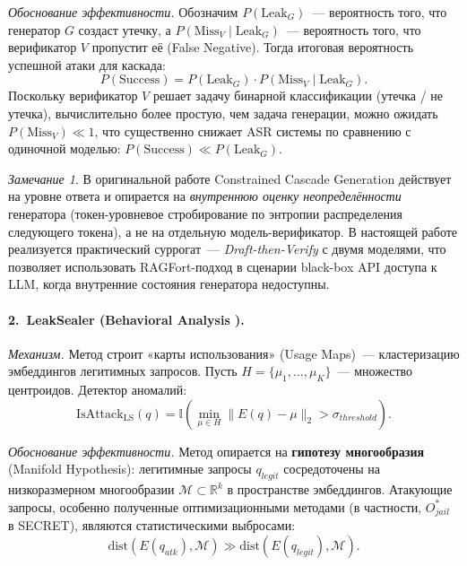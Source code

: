 \documentclass[12pt, a4paper]{article}
\theoremstyle{definition}
\theoremstyle{remark}
\newtheorem*{remark}{Замечание}
\begin{document}
\textit{Обоснование эффективности.} Обозначим $P(\mathrm{Leak}_G)$~--- вероятность того, что генератор $G$ создаст утечку, а $P(\mathrm{Miss}_V \mid \mathrm{Leak}_G)$~--- вероятность того, что верификатор $V$ пропустит её (False Negative). Тогда итоговая вероятность успешной атаки для каскада:
\begin{equation}
    P(\text{Success}) = P(\mathrm{Leak}_G) \cdot P(\mathrm{Miss}_V \mid \mathrm{Leak}_G).
\end{equation}
Поскольку верификатор $V$ решает задачу бинарной классификации (утечка / не утечка), вычислительно более простую, чем задача генерации, можно ожидать $P(\mathrm{Miss}_V) \ll 1$, что существенно снижает ASR системы по сравнению с одиночной моделью: $P(\text{Success}) \ll P(\mathrm{Leak}_G)$.

\begin{remark}
В оригинальной работе \cite{RAGFort2025} Constrained Cascade Generation действует на уровне ответа и опирается на \textit{внутреннюю оценку неопределённости} генератора (токен-уровневое стробирование по энтропии распределения следующего токена), а не на отдельную модель-верификатор. В настоящей работе реализуется практический суррогат~--- \textit{Draft-then-Verify} с двумя моделями, что позволяет использовать RAGFort-подход в сценарии black-box API доступа к LLM, когда внутренние состояния генератора недоступны.
\end{remark}

\paragraph{2.~LeakSealer (Behavioral Analysis \cite{LeakSealer2025}).}

\textit{Механизм.} Метод строит «карты использования» (Usage Maps)~--- кластеризацию эмбеддингов легитимных запросов. Пусть $H = \{\mu_1, \dots, \mu_K\}$~--- множество центроидов. Детектор аномалий:
\begin{equation}
    \mathrm{IsAttack}_{\text{LS}}(q) = \mathbb{I}\!\left( \min_{\mu \in H} \lVert E(q) - \mu \rVert_2 > \sigma_{threshold} \right).
\end{equation}

\textit{Обоснование эффективности.} Метод опирается на \textbf{гипотезу многообразия} (Manifold Hypothesis): легитимные запросы $q_{legit}$ сосредоточены на низкоразмерном многообразии $\mathcal{M} \subset \mathbb{R}^k$ в пространстве эмбеддингов. Атакующие запросы, особенно полученные оптимизационными методами (в частности, $O^*_{jail}$ в SECRET), являются статистическими выбросами:
\begin{equation}
    \text{dist}(E(q_{atk}), \mathcal{M}) \gg \text{dist}(E(q_{legit}), \mathcal{M}).
\end{equation}
\end{document}

